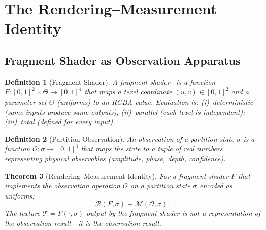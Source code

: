 \documentclass[11pt,twocolumn,a4paper]{article}
\newtheorem{theorem}{Theorem}[section]
\newtheorem{definition}[theorem]{Definition}
\newcommand{\Obs}{\mathcal{O}}
\newcommand{\Rend}{\mathcal{R}}
\newcommand{\Meas}{\mathcal{M}}
\newcommand{\Tex}{\mathcal{T}}
\begin{document}
\section{The Rendering--Measurement Identity}
\label{sec:rendering-measurement}

\subsection{Fragment Shader as Observation Apparatus}

\begin{definition}[Fragment Shader]
\label{def:fragment-shader}
A \emph{fragment shader}~\citep{khronosglsl,khronoswebgl2} is a
function $F : [0,1]^2 \times \Theta \to [0,1]^4$ that maps a texel
coordinate $(u,v) \in [0,1]^2$ and a parameter set
$\Theta$ (uniforms) to an RGBA value.  Evaluation is:
(i)~deterministic (same inputs produce same outputs);
(ii)~parallel (each texel is independent);
(iii)~total (defined for every input).
\end{definition}

\begin{definition}[Partition Observation]
\label{def:observation}
An \emph{observation} of a partition state $\sigma$ is a function
$\Obs : \sigma \to [0,1]^4$ that maps the state to a tuple of real
numbers representing physical observables (amplitude, phase, depth,
confidence).
\end{definition}

\begin{theorem}[Rendering--Measurement Identity]
\label{thm:rmi}
For a fragment shader $F$ that implements the observation operation
$\Obs$ on a partition state $\sigma$ encoded as uniforms:
\begin{equation}
  \Rend(F, \sigma) \equiv \Meas(\Obs, \sigma).
  \label{eq:rmi}
\end{equation}
The texture $\Tex = F(\cdot, \sigma)$ output by the fragment shader is
not a representation of the observation result---it \emph{is} the
observation result.
\end{theorem}
\end{document}
